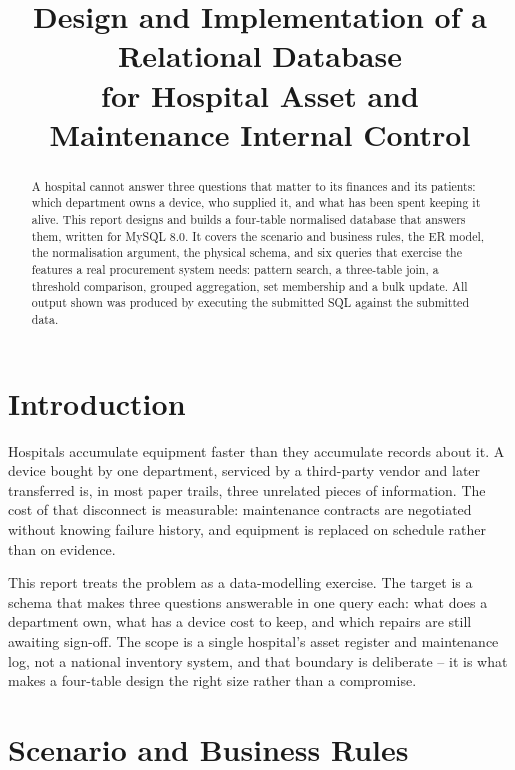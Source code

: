 \documentclass[conference,9pt]{IEEEtran}
\begin{document}
\title{\vspace{-1.6em}Design and Implementation of a Relational Database\\for Hospital Asset and Maintenance Internal Control}
\author{}
\maketitle
\vspace{-1.2em}

\begin{abstract}
A hospital cannot answer three questions that matter to its finances and its
patients: which department owns a device, who supplied it, and what has been
spent keeping it alive. This report designs and builds a four-table
normalised database that answers them, written for MySQL 8.0. It covers the
scenario and business rules, the ER model, the normalisation argument, the
physical schema, and six queries that exercise the features a real
procurement system needs: pattern search, a three-table join, a threshold
comparison, grouped aggregation, set membership and a bulk update. All output
shown was produced by executing the submitted SQL against the submitted data.
\end{abstract}

\section{Introduction}
Hospitals accumulate equipment faster than they accumulate records about it.
A device bought by one department, serviced by a third-party vendor and later
transferred is, in most paper trails, three unrelated pieces of information.
The cost of that disconnect is measurable: maintenance contracts are
negotiated without knowing failure history, and equipment is replaced on
schedule rather than on evidence.

This report treats the problem as a data-modelling exercise. The target is a
schema that makes three questions answerable in one query each: what does a
department own, what has a device cost to keep, and which repairs are still
awaiting sign-off. The scope is a single hospital's asset register and
maintenance log, not a national inventory system, and that boundary is
deliberate -- it is what makes a four-table design the right size rather than
a compromise.

\section{Scenario and Business Rules}
\end{document}
